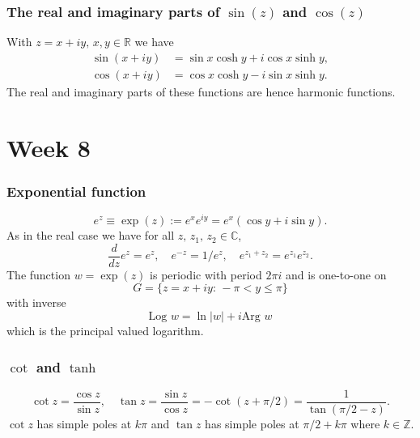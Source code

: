\documentclass{article}
\begin{document}
\subsubsection{The real and imaginary parts of $\sin(z)$ and $\cos(z)$}
With $z=x+iy,\,x,y\in\mathbb{R}$ we have
\begin{align}
    \sin{(x+iy)} &= \sin{x}\cosh{y} + i\cos{x}\sinh{y}, \\
    \cos{(x+iy)} &= \cos{x}\cosh{y}-i\sin{x}\sinh{y}.
\end{align}
The real and imaginary parts of these functions are hence harmonic functions.

\section{Week 8}
\subsubsection{Exponential function}
\begin{equation}
    e^z \equiv \exp{(z)}:=e^x e^{iy} = e^x (\cos{y}+i\sin{y}).
\end{equation}
As in the real case we have for all $z,\,z_1,\,z_2\in\mathbb{C}$,
\begin{equation}
    \frac{d}{dz}e^z=e^z,\quad e^{-z}=1/e^z,\quad e^{z_1+z_2}=e^{z_1}e^{z_2}.
\end{equation}
The function $w=\exp{(z)}$ is periodic with period $2\pi i$ and is one-to-one on
\begin{equation}
    G = \{ z=x+iy:\, -\pi<y\leq\pi \}
\end{equation}
with inverse
\begin{equation}
    \text{Log }w = \ln{\vert w\vert} + i\text{Arg }{w}
\end{equation}
which is the principal valued logarithm.

\subsubsection{$\cot$ and $\tanh$}
\begin{equation}
    \cot{z} = \frac{\cos{z}}{\sin{z}},\quad \tan{z} = \frac{\sin{z}}{\cos{z}}=-\cot{(z+\pi/2)} = \frac{1}{\tan{(\pi/2-z)}}.
\end{equation}
$\cot{z}$ has simple poles at $k\pi$ and $\tan{z}$ has simple poles at $\pi/2+k\pi$ where $k\in\mathbb{Z}$.
\end{document}
